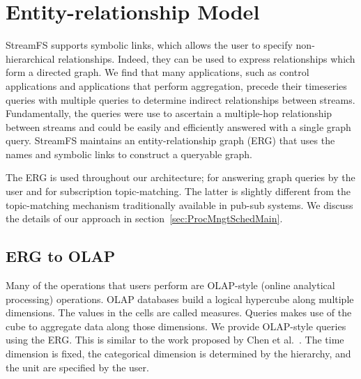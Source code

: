 


\section{Entity-relationship Model}

StreamFS supports symbolic links, which allows the user to specify non-hierarchical relationships.  Indeed, they can 
be used to express relationships which form a directed graph.  We find that many applications, such as control 
applications and applications that perform aggregation, precede their timeseries queries with multiple queries
to determine indirect relationships between streams.  Fundamentally, the queries were use to ascertain a multiple-hop
relationship between streams and could be easily and efficiently answered with a single graph query.
StreamFS maintains an entity-relationship graph (ERG) that uses the names and symbolic links to construct a queryable 
graph.

The ERG is used throughout our architecture; for answering graph queries by the user and for subscription topic-matching.
The latter is slightly different from the topic-matching mechanism traditionally available in pub-sub systems. 
We discuss the details of our approach in section~\ref{sec:ProcMngtSchedMain}.


\subsection{ERG to OLAP}
\label{sec:erg2olap}

Many of the operations that users perform are OLAP-style (online analytical processing) operations\cite{Gray1996}. 
OLAP databases build a logical hypercube along multiple dimensions.  The values in the cells are called 
measures.  Queries makes use of the cube to aggregate data along those dimensions.
We provide OLAP-style queries using the ERG.  This is similar to the work proposed by Chen et al.~\cite{Chen2008_olapgraph}.
The time dimension is fixed, the categorical dimension is determined by the hierarchy, and the unit are specified
by the user.

